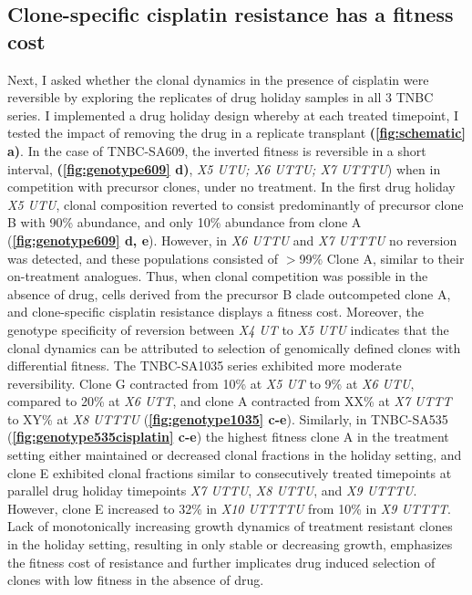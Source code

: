 \subsection {Clone-specific cisplatin resistance has a fitness cost}
Next, I asked whether the clonal dynamics in the presence of cisplatin were reversible by exploring the replicates of drug holiday samples in
 all 3 TNBC series. I implemented a drug holiday design whereby at each treated timepoint, I tested the impact of removing the drug in a replicate transplant \textbf{(\autoref{fig:schematic} a)}. In the case of TNBC-SA609, the inverted fitness is reversible in a short interval, \textbf{(\autoref{fig:genotype609} d)}, \textit{X5 UTU; X6 UTTU; X7 UTTTU}) when in competition with precursor clones, under no treatment. In the first drug holiday \textit{X5 UTU}, clonal composition reverted to consist predominantly of precursor clone B with 90\% abundance, and only 10\% abundance from clone A (\textbf{\autoref{fig:genotype609} d, e}). However, in \textit{X6  UTTU} and \textit{X7 UTTTU} no reversion was detected, and these populations consisted of $>$99\% Clone A, similar to their on-treatment analogues. Thus, when clonal competition was possible in the absence of drug, cells derived from the precursor B clade outcompeted clone A, and clone-specific cisplatin resistance displays a fitness cost. Moreover, the genotype specificity of reversion between \textit{X4 UT} to \textit{X5 UTU} indicates that the clonal dynamics can be attributed to selection of genomically defined clones with differential fitness. The TNBC-SA1035 series exhibited more moderate reversibility. Clone G contracted from 10\% at \textit{X5 UT} to 9\% at \textit{X6 UTU}, compared to 20\% at \textit{X6 UTT}, and clone A contracted from XX\% at \textit{X7 UTTT} to XY\% at \textit{X8 UTTTU} (\textbf{\autoref{fig:genotype1035} c-e}). 
Similarly, in TNBC-SA535 (\textbf{\autoref{fig:genotype535cisplatin} c-e}) the highest fitness clone A in the treatment setting either maintained or decreased clonal fractions in the holiday setting, and clone E exhibited clonal fractions similar to consecutively treated timepoints at parallel drug holiday timepoints \textit{X7 UTTU}, \textit{X8 UTTU}, and \textit{X9 UTTTU}.  However, clone E increased to 32\% in \textit{X10 UTTTTU} from 10\% in \textit{X9 UTTTT}.  Lack of monotonically increasing growth dynamics of treatment resistant clones in the holiday setting, resulting in only stable or decreasing growth, emphasizes the fitness cost of resistance and further implicates drug induced selection of clones with low fitness in the absence of drug.     



